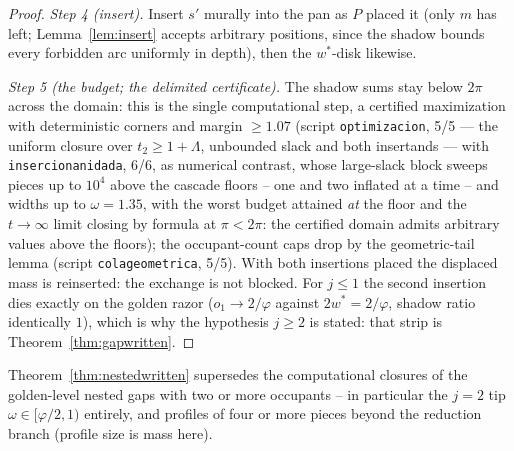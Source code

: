 \documentclass[11pt]{article}
\theoremstyle{definition}
\begin{document}
\begin{proof}
\emph{Step 4 (insert).} Insert $s'$ murally into the pan as $P$
placed it (only $m$ has left; Lemma~\ref{lem:insert} accepts
arbitrary positions, since the shadow bounds every forbidden arc
uniformly in depth), then the $w^{*}$-disk likewise.

\emph{Step 5 (the budget; the delimited certificate).} The shadow
sums stay below $2\pi$ across the domain: this is the single
computational step, a certified maximization with deterministic
corners and margin $\ge1.07$ (script
\texttt{optimizacion}, 5/5 — the uniform closure over
$t_2\ge1+\Lambda$, unbounded slack and both insertands — with
\texttt{insercionanidada}, 6/6, as numerical contrast, whose large-slack block sweeps pieces up to $10^{4}$ above the
cascade floors -- one and two inflated at a time -- and widths up to
$\omega=1.35$, with the worst budget attained \emph{at} the floor
and the $t\to\infty$ limit closing by formula at $\pi<2\pi$: the
certified domain admits arbitrary values above the floors); the
occupant-count caps drop by the geometric-tail lemma
(script \texttt{colageometrica}, 5/5). With both insertions placed
the displaced mass is reinserted: the exchange is not blocked. For
$j\le1$ the second insertion dies exactly on the golden razor
($o_1\to2/\varphi$ against $2w^{*}=2/\varphi$, shadow ratio
identically $1$), which is why the hypothesis $j\ge2$ is stated:
that strip is Theorem~\ref{thm:gapwritten}.
\end{proof}

Theorem~\ref{thm:nestedwritten} supersedes the computational
closures of the golden-level nested gaps with two or more occupants
-- in particular the $j=2$ tip $\omega\in[\varphi/2,1)$ entirely, and
profiles of four or more pieces beyond the reduction branch (profile
size is mass here).
\end{document}
